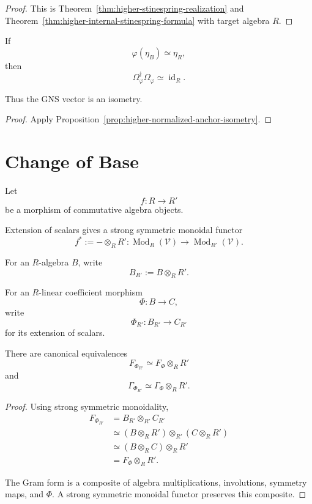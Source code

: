 \begin{proof}
This is
Theorem~\ref{thm:higher-stinespring-realization} and
Theorem~\ref{thm:higher-internal-stinespring-formula} with target algebra
\(R\).
\end{proof}

\begin{corollary}
\label{cor:higher-normalized-gns-vector}
If
\[
  \varphi(\eta_B)
  \simeq
  \eta_R,
\]
then
\[
  \Omega_\varphi^\dagger\Omega_\varphi
  \simeq
  \operatorname{id}_R.
\]

Thus the GNS vector is an isometry.
\end{corollary}

\begin{proof}
Apply
Proposition~\ref{prop:higher-normalized-anchor-isometry}.
\end{proof}

\section{Change of Base}
\label{sec:higher-stinespring-base-change}

Let
\[
  f:R\to R'
\]
be a morphism of commutative algebra objects.

Extension of scalars gives a strong symmetric monoidal functor
\[
  f^*
  :=
  -\otimes_RR':
  \operatorname{Mod}_R(\mathcal V)
  \longrightarrow
  \operatorname{Mod}_{R'}(\mathcal V).
\]

For an \(R\)-algebra \(B\), write
\[
  B_{R'}
  :=
  B\otimes_RR'.
\]

For an \(R\)-linear coefficient morphism
\[
  \Phi:B\to C,
\]
write
\[
  \Phi_{R'}:
  B_{R'}
  \to
  C_{R'}
\]
for its extension of scalars.

\begin{proposition}
\label{prop:higher-base-change-free-gram}
There are canonical equivalences
\[
  F_{\Phi_{R'}}
  \simeq
  F_\Phi\otimes_RR'
\]
and
\[
  \Gamma_{\Phi_{R'}}
  \simeq
  \Gamma_\Phi\otimes_RR'.
\]
\end{proposition}

\begin{proof}
Using strong symmetric monoidality,
\[
\begin{aligned}
  F_{\Phi_{R'}}
  &=
  B_{R'}\otimes_{R'}C_{R'}
  \\
  &\simeq
  (B\otimes_RR')
  \otimes_{R'}
  (C\otimes_RR')
  \\
  &\simeq
  (B\otimes_RC)\otimes_RR'
  \\
  &=
  F_\Phi\otimes_RR'.
\end{aligned}
\]

The Gram form is a composite of algebra multiplications, involutions,
symmetry maps, and \(\Phi\). A strong symmetric monoidal functor preserves
this composite.
\end{proof}


